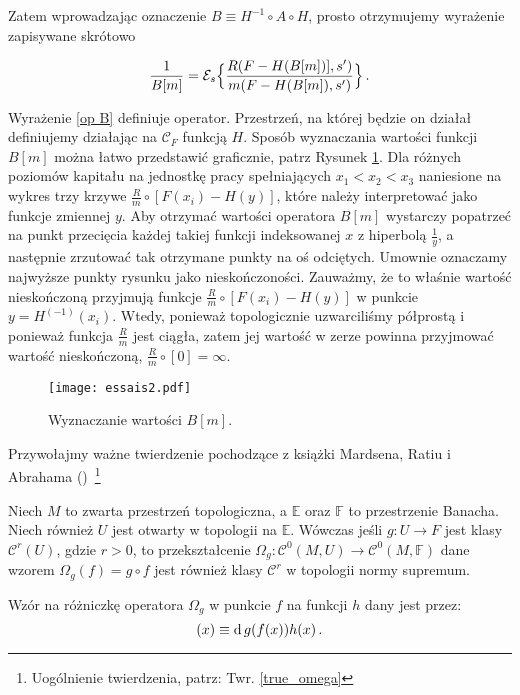 Zatem wprowadzając oznaczenie $ B \equiv H^{-1} \circ A \circ H $, prosto otrzymujemy wyrażenie zapisywane skrótowo

\begin{equation}\label{op B}
\frac{1}{B[m]} =   \mathcal{E}_s \Bigl \{ \frac{R(F-H(B[m])],s')}{m(F-H(B[m]), s')}	\Bigl \} \,.
\end{equation}

Wyrażenie \ref{op B} definiuje operator. Przestrzeń, na której będzie on działał definiujemy działając na $ \mathcal{C}_F $ funkcją $ H $. Sposób wyznaczania wartości funkcji $B[m]$ można łatwo przedstawić graficznie, patrz Rysunek \ref{rys1}. Dla różnych poziomów kapitału na jednostkę pracy spełniających $x_1 < x_2 < x_3$ naniesione na wykres trzy krzywe $\frac{R}{m}\circ [F(x_i) - H(y)]$, które należy interpretować jako funkcje zmiennej $y$. Aby otrzymać wartości operatora $B[m]$ wystarczy popatrzeć na punkt przecięcia każdej takiej funkcji indeksowanej $x$ z hiperbolą $\frac{1}{y}$, a następnie zrzutować tak otrzymane punkty na oś odciętych. Umownie oznaczamy najwyższe punkty rysunku jako nieskończoności. Zauważmy, że to właśnie wartość nieskończoną przyjmują funkcje $\frac{R}{m}\circ [F(x_i) - H(y)]$ w punkcie $y = H^{(-1)}(x_i)$. Wtedy, ponieważ topologicznie uzwarciliśmy półprostą i ponieważ funkcja $\frac{R}{m}$ jest ciągła, zatem jej wartość w zerze powinna przyjmować wartość nieskończoną,  $\frac{R}{m}\circ [0] = \infty$. 

\begin{figure}
	\begin{center}
		\texttt{[image: essais2.pdf]} 
		\caption[Wyznaczanie wartości $B\brackets{m}$]{Wyznaczanie wartości $B[m]$. \\ }\label{rys1}
	\end{center}
\end{figure}

Przywołajmy ważne twierdzenie pochodzące z książki Mardsena, Ratiu i Abrahama (\citeyear[][Str. 92]{Mardsen})~\footnote{Uogólnienie twierdzenia, patrz: Twr. \ref{true_omega}}

\begin{tw}\label{First diff} 
	Niech $ M $ to zwarta przestrzeń topologiczna, a $ \mathbb{E} $ oraz $ \mathbb{F} $ to przestrzenie Banacha. Niech również $ U $ jest otwarty w topologii na $ \mathbb{E} $. Wówczas jeśli $ g: U \rightarrow F $ jest klasy $ \mathcal{C}^{r}(U) $, gdzie $ r >0 $, to przekształcenie $ \Omega_g : \mathcal{C}^{0}(M, U) \rightarrow \mathcal{C}^{0}(M, \mathbb{F}) $ dane wzorem $ \Omega_g (f) = g \circ f $ jest również klasy $ \mathcal{C}^r $ w topologii normy supremum. 
	
Wzór na różniczkę operatora $ \Omega_g $ w punkcie $ f $ na funkcji $ h $ dany jest przez:
\begin{equation*}
 [\diff{\Omega_g}(f)h](x) \equiv \diff{g}(f(x))h(x)\,.
\end{equation*}
\end{tw} 
 
